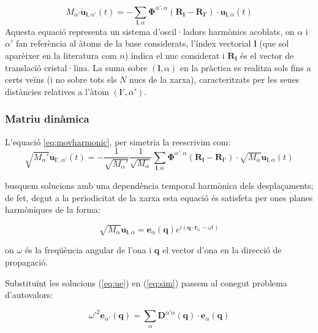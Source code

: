 \documentclass[12pt]{article} %
\let\vec\mathbf %
\begin{document}
\begin{equation}
\label{eq:movharmonic}
 M_{\alpha'}\vec{\ddot{u}}_{\vec l,\alpha'}(t)=-\sum_{\vec l,\alpha}\vec\Phi^{\alpha',\alpha}\left(\vec R_{\vec l}-\vec R_{\vec l'}\right)\cdot\vec u_{\vec l,\alpha}(t)
\end{equation}
 Aquesta equació representa un sistema  d'oscil·ladors harmònics acoblats, on $\alpha$ i $\alpha'$ fan referència al àtoms de la base considerats, l'índex vectorial $\vec l$ (que sol aparèixer en la literatura com $n$) índica el nuc considerat i $\vec R_\vec l$ és el vector de translació cristal·lina. La suma sobre $(\vec l, \alpha)$ en la pràctica es realitza sols fins a certs veïns (i no sobre tots els $N$ nucs de la xarxa), caracteritzats per les seues distàncies relatives a l'àtom $(\vec l',\alpha')$.
 
\subsubsection{Matriu dinàmica}

L'equació \ref{eq:movharmonic}, per simetria la reescrivim com:
\begin{equation}
\label{eq:sim}
 \sqrt{M_\alpha'}\vec{\ddot{u}}_{\vec l',\alpha'}(t)=-\frac{1}{\sqrt{M_\alpha'}}\frac{1}{\sqrt{M_\alpha}}\sum_{\vec l,\alpha}\vec\Phi^{\alpha',\alpha}\left(\vec R_{\vec l}-\vec R_{\vec l'}\right)\cdot\sqrt{M_\alpha} \vec u_{\vec l,\alpha}(t)
\end{equation}

busquem solucions amb una dependència temporal harmònica dels desplaçaments; de fet, degut a la periodicitat de la xarxa esta equació és satisfeta per ones planes harmòniques de la forma:

\begin{equation}
\label{eq:ue}
 \sqrt{M_\alpha} \vec u_{\vec l,\alpha}=\vec e_\alpha(\vec q)e^{i\left(\vec q\cdot\vec r_\alpha-\omega t\right)}
\end{equation}

on $\omega$ és la freqüència angular de l'ona i $\vec q$ el vector d'ona en la direcció de propagació.

Substituïnt les solucions (\ref{eq:ue}) en (\ref{eq:sim}) passem al conegut problema d'autovalors:

\begin{equation}
{\omega'}^{2}\vec e_{\alpha'}(\vec q)=\sum_{\alpha}\vec D^{\alpha'\alpha}(\vec q)\cdot\vec e_{\alpha}(\vec q)
\end{equation}   
\end{document}
